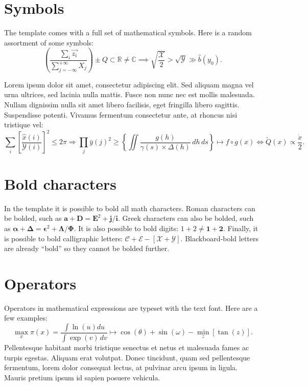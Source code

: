 \section{Symbols} 

The template comes with a full set of mathematical symbols. Here is a random assortment of some symbols: 
\begin{equation}
\left(\frac{\sum_i \vec{z_i}}{\sum_{j=-\infty}^{+\infty} X_j}\right) \pm Q \subset \mathbb{R} \neq \mathbb{C} \implies \sqrt{\frac{\mathcal{X}}{2}} > \sqrt{\mathcal{Y}} \gg \hat{b}(y_0).
\label{e:symbols}\end{equation}

Lorem ipsum dolor sit amet, consectetur adipiscing elit. Sed aliquam magna vel urna ultrices, sed lacinia nulla mattis. Fusce non nunc nec est mollis malesuada. Nullam dignissim nulla sit amet libero facilisis, eget fringilla libero sagittis. Suspendisse potenti. Vivamus fermentum consectetur ante, at rhoncus nisi tristique vel:
\begin{equation}
\sum_i \left[\frac{\hat{x}(i)}{\mathcal{Y}(i)}\right]^2 \leq 2\pi \Rightarrow \prod_j \bar{y}(j)^2 \geq \left\{\iint \frac{g(h)}{\gamma(s) \times \Delta(h)}\,dh\,ds \right\} \mapsto f\circ g(x) \iff \tilde{Q}(x) \propto \frac{\dot{x}}{2}.
\end{equation}

\section{Bold characters}

In the template it is possible to bold all math characters. Roman characters can be bolded, such as $\bm{a} + \bm{D} = \bm{E}^2 + \bm{j}/\bm{i}$. Greek characters can also be bolded, such as $\bm{\alpha} + \bm{\Delta} = \bm{\epsilon}^2 + \bm{\Lambda}/\bm{\Phi}$. It is also possible to bold digits: $1 + 2 \neq \bm{1} + \bm{2}$. Finally, it is possible to bold calligraphic letters: $\bm{\mathcal{C}} + \bm{\mathcal{E}} - [\bm{\mathcal{X}}+\bm{\mathcal{Y}}]$. Blackboard-bold letters are already ``bold'' so they cannot be bolded further.

\section{Operators} 

Operators in mathematical expressions are typeset with the text font. Here are a few examples: 
\begin{equation}
\max_x \pi(x) = \frac{\int \ln(u)du}{\int\exp(v)\,dv} \mapsto \cos(\theta) + \sin(\omega) - \min_z[\tan(z)].
\label{e:operators}\end{equation}
Pellentesque habitant morbi tristique senectus et netus et malesuada fames ac turpis egestas. Aliquam erat volutpat. Donec tincidunt, quam sed pellentesque fermentum, lorem dolor consequat lectus, at pulvinar arcu ipsum in ligula. Mauris pretium ipsum id sapien posuere vehicula. 

